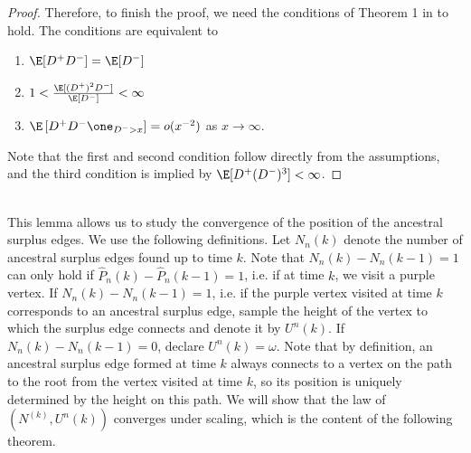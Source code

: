 \begin{proof}
Therefore, to finish the proof, we need the conditions of Theorem 1 in \cite{deraphelisScalingLimitMultitype2017} to hold. The conditions are equivalent to 
\begin{enumerate}
    \item $\E[D^+D^-]=\E[D^-]$
    \item $1<\frac{\E[(D^+)^2D^-]}{\E[D^-]}<\infty$
    \item $\E\left[D^+D^-\one_{D^->x}\right]=o(x^{-2})$ as $x\to \infty$. 
\end{enumerate}
Note that the first and second condition follow directly from the assumptions, and the third condition is implied by $\E[D^+(D^-)^3]<\infty$.
\end{proof}\\

This lemma allows us to study the convergence of the position of the ancestral surplus edges. We use the following definitions. Let $N_n(k)$ denote the number of ancestral surplus edges found up to time $k$. Note that $N_n(k)-N_n(k-1)=1$ can only hold if $\hat{P}_n(k)-\hat{P}_n(k-1)=1$, i.e. if at time $k$, we visit a purple vertex. If $N_n(k)-N_n(k-1)=1$, i.e. if the purple vertex visited at time $k$ corresponds to an ancestral surplus edge, sample  the height of the vertex to which the surplus edge connects and denote it by $U^n(k)$. If $N_n(k)-N_n(k-1)=0$, declare $U^n(k)=\omega$. Note that by definition, an ancestral surplus edge formed at time $k$ always connects to a vertex on the path to the root from the vertex visited at time $k$, so its position is uniquely determined by the height on this path. We will show that the law of $(N^(k),U^n(k))$ converges under scaling, which is the content of the following theorem. 

